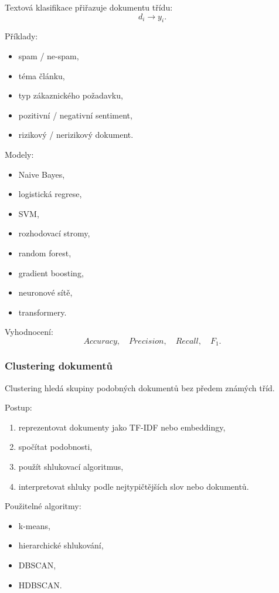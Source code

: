 Textová klasifikace přiřazuje dokumentu třídu:
\[
d_i \rightarrow y_i.
\]

Příklady:
\begin{itemize}
    \item spam / ne-spam,
    \item téma článku,
    \item typ zákaznického požadavku,
    \item pozitivní / negativní sentiment,
    \item rizikový / nerizikový dokument.
\end{itemize}

Modely:
\begin{itemize}
    \item Naive Bayes,
    \item logistická regrese,
    \item SVM,
    \item rozhodovací stromy,
    \item random forest,
    \item gradient boosting,
    \item neuronové sítě,
    \item transformery.
\end{itemize}

Vyhodnocení:
\[
Accuracy,\quad Precision,\quad Recall,\quad F_1.
\]

\subsubsection{Clustering dokumentů}

Clustering hledá skupiny podobných dokumentů bez předem známých tříd.

Postup:
\begin{enumerate}
    \item reprezentovat dokumenty jako TF-IDF nebo embeddingy,
    \item spočítat podobnosti,
    \item použít shlukovací algoritmus,
    \item interpretovat shluky podle nejtypičtějších slov nebo dokumentů.
\end{enumerate}

Použitelné algoritmy:
\begin{itemize}
    \item k-means,
    \item hierarchické shlukování,
    \item DBSCAN,
    \item HDBSCAN.
\end{itemize}

